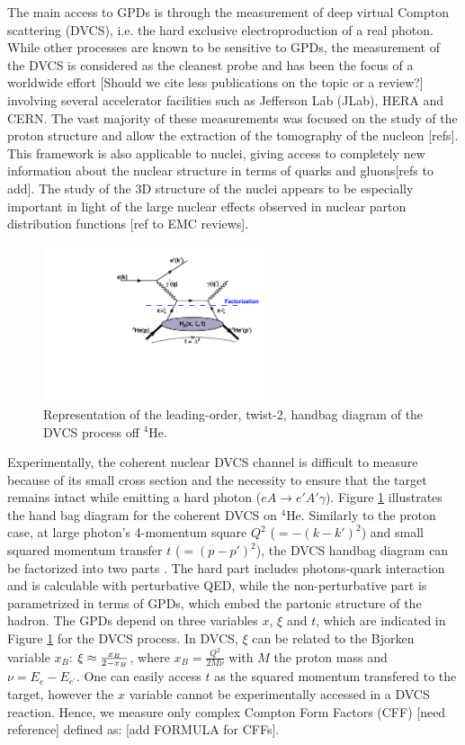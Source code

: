 \documentclass[nofootinbib,twocolumn,showpacs,prl,superscriptaddress,secnumarabic,amssymb,nobibnotes,aps,floatfix]{revtex4}
\begin{document}
The main access to GPDs is through the measurement of deep virtual Compton 
scattering (DVCS), i.e. the hard exclusive electroproduction of a real photon. 
While other processes are known to be sensitive to GPDs, the measurement of the
DVCS is considered as the cleanest probe and has been the focus of a worldwide effort 
\cite{Stepanyan:2001sm,Airapetian,Chekanov:2003ya,Aktas:2005ty,Chen:2006na,Munoz 
Camacho:2006hx,Girod:2007aa,Gavalian:2009,Seder:2015,Pisano:2015,Jo:2015ema} 
[Should we cite less publications on the topic or a review?]
involving several accelerator facilities such as Jefferson Lab (JLab), HERA and  
CERN. The vast majority of these measurements was focused on the study of the 
proton structure and allow the extraction of the tomography of the nucleon [refs].
This framework is also applicable to nuclei, giving access to completely new 
information about the nuclear structure in terms of quarks and gluons[refs to add].
The study of the 3D structure of the nuclei appears to be especially important
in light of the large nuclear effects observed in nuclear parton distribution 
functions [ref to EMC reviews]. 

\begin{figure}[tb]
\includegraphics[width=6.5cm]{figs/DVCS_diagram.pdf}
\caption{Representation of the leading-order, twist-2, handbag diagram of the 
DVCS process off $^4$He.}
\label{fig:diags}
\end{figure}

Experimentally, the coherent nuclear DVCS channel is difficult to measure because of 
its small cross section and the necessity to ensure that the target remains 
intact while emitting a hard photon ($eA \rightarrow e' A' \gamma$). Figure 
\ref{fig:diags} illustrates the hand bag diagram for the coherent DVCS on 
$^4$He. Similarly to the proton case, at large photon's 4-momentum square 
$Q^2$ ($= -(k-k')^{2}$) and small squared momentum transfer $t$ 
($= (p-p')^{2}$), the DVCS handbag diagram can be factorized into two parts 
\cite{Freund_Collins,Ji_Osborne}. The hard part includes photons-quark 
interaction and is calculable with perturbative QED, while the non-perturbative 
part is parametrized in terms of GPDs, which embed the partonic structure of 
the hadron. The GPDs depend on three variables $x$, $\xi$ and $t$, which are 
indicated in Figure \ref{fig:diags} for the DVCS process. In DVCS, $\xi$ can 
be related to the Bjorken variable $x_{B}$: $\xi\approx {{x_B}\over{2-x_B}}$, 
where $x_B=\frac{Q^2}{2M\nu}$ with $M$ the proton mass and 
$\nu=E_e-E_{e^\prime}$. One can easily access $t$ as the squared momentum 
transfered to the target, however the $x$ variable cannot be experimentally 
accessed in a DVCS reaction. Hence, we measure only complex Compton Form 
Factors (CFF) [need reference] defined as: [add FORMULA for CFFs]. 
\end{document}
